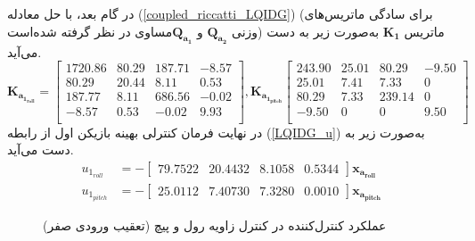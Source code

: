 در گام بعد، با حل معادله
(\ref{coupled_riccatti_LQIDG})
(برای سادگی ماتریس‌های وزنی $\boldsymbol{{Q}_{a_2}}$ و $\boldsymbol{{Q}_{a_1}}$مساوی در نظر گرفته شده‌است)
ماتریس
$\boldsymbol{{K}_1}$
به‌صورت زیر به دست می‌آید.
\begin{equation}
	\boldsymbol{K_{a_{1_{roll}}}} = \begin{bmatrix}
1720.86 & 80.29 & 187.71 & -8.57 \\
80.29 & 20.44 & 8.11 & 0.53 \\
187.77 & 8.11 & 686.56 & -0.02 \\
-8.57 & 0.53 & -0.02 & 9.93 \\
	\end{bmatrix}, \boldsymbol{K_{a_{1_{pitch}}}} \begin{bmatrix}
243.90 & 25.01 & 80.29 & -9.50 \\
25.01 & 7.41 & 7.33 & 0 \\
80.29 & 7.33 & 239.14 & 0 \\
-9.50 & 0 & 0 & 9.50 \\
\end{bmatrix}
\end{equation}
در نهایت فرمان کنترلی بهینه بازیکن اول از رابطه
(\ref{LQIDG_u})
به‌صورت زیر به دست می‌آید.
\begin{equation}
	\begin{split}
		u_{1_{roll}} &= -\begin{bmatrix}
			79.7522 &20.4432 &8.1058 &0.5344 
		\end{bmatrix} \boldsymbol{x_{a_{roll}}} \\
	u_{1_{pitch}} &= -\begin{bmatrix}
		25.0112 &7.40730 &7.3280 &0.0010
	\end{bmatrix} \boldsymbol{x_{a_{pitch}}}
	\end{split}
\end{equation}
%	
\begin{figure}[H]
	\centering
	\caption{‫‪عملکرد کنترل‌کننده  در کنترل زاویه رول و پیچ (تعقیب ورودی صفر)}
	\label{lqidg_roll_pitch_fig_simulation}
\end{figure}



